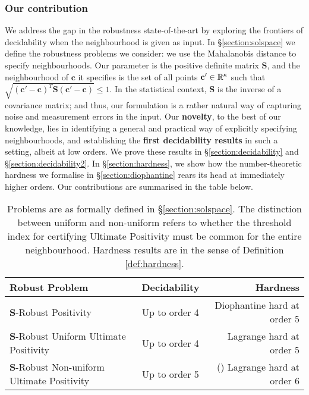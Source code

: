 \subsubsection*{Our contribution}
We address the gap in the robustness state-of-the-art by exploring the frontiers of decidability when the neighbourhood is given as input. In \S\ref{section:solspace} we define the robustness problems we consider: we use the Mahalanobis distance to specify neighbourhoods. Our parameter is the positive definite matrix $\mathbf{S}$, and the neighbourhood of $\mathbf{c}$ it specifies is the set of all points $\mathbf{c'} \in \mathbb{R}^{\kappa}$ such that $\sqrt{(\mathbf{c'} - \mathbf{c})^T\mathbf{S}(\mathbf{c'} - \mathbf{c})} \le 1$. In the statistical context, $\mathbf{S}$ is the inverse of a covariance matrix; and thus, our formulation is a rather natural way of capturing noise and measurement errors in the input. Our \textbf{novelty}, to the best of our knowledge, lies in identifying a general and practical way of explicitly specifying neighbourhoods, and establishing the \textbf{first decidability results} in such a setting, albeit at low orders. We prove these results in \S\ref{section:decidability} and \S\ref{section:decidability2}. In \S\ref{section:hardness}, we show how the number-theoretic hardness we formalise in \S\ref{section:diophantine} rears its head at immediately higher orders. Our contributions are summarised in the table below.
\begin{table}[H]
\begin{tabular}{|l|c|r|}
  \hline
   \textbf{Robust Problem}& \textbf{Decidability }& {\bf Hardness} \\
  \hline
  $\mathbf{S}$-Robust Positivity & Up to order 4 & Diophantine hard at order 5\\
  $\mathbf{S}$-Robust Uniform Ultimate Positivity & Up to order 4 & Lagrange hard at order 5 \\
  $\mathbf{S}$-Robust Non-uniform Ultimate Positivity & Up to order 5 & (\cite{originalarxiv,joeljames3}) Lagrange hard at order 6 
  \\
  \hline
\end{tabular}

\caption{Problems are as formally defined in \S\ref{section:solspace}. The distinction between uniform and non-uniform refers to whether the threshold index for certifying Ultimate Positivity must be common for the entire neighbourhood. Hardness results are in the sense of Definition \ref{def:hardness}.}%
  \label{tab:results}
\end{table}

